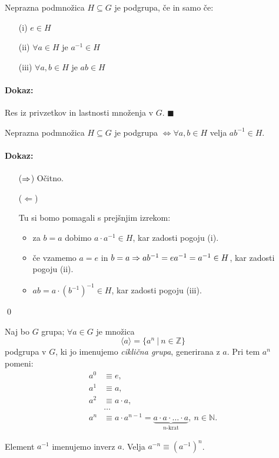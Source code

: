 \begin{trditev}
	Neprazna podmno\v zica $H \subseteq G$ je podgrupa, \v ce in samo \v ce:
	\begin{itemize}
		\item[(i)]{$e \in H$}
		\item[(ii)]{$\forall a \in H$ je $a^{-1} \in H$}
		\item[(iii)]{$\forall a,b \in H$ je $ab \in H$}
	\end{itemize}
\end{trditev}

\paragraph{Dokaz:} Res iz privzetkov in lastnosti mno\v zenja v $G$. $\blacksquare$

\begin{trditev}
	Neprazna podmno\v zica $H \subseteq G$ je podgrupa $\iff \forall a,b \in H$ velja $ab^{-1} \in H$.
\end{trditev}

\paragraph{Dokaz:}
\begin{itemize}
	\item[($\Rightarrow$)]{ O\v citno.}
	\item[($\Leftarrow$)]{Tu si bomo pomagali s prej\v snjim izrekom:
		\begin{itemize}
			\item{za $b = a$ dobimo $a\cdot a^{-1} \in H$, kar zadosti pogoju (i).}
			\item{\v ce vzamemo $a = e$ in $b = a \Rightarrow ab^{-1} = ea^{-1} = a^{-1} \in H$, kar zadosti pogoju (ii).}
			\item{$ab = a \cdot (b^{-1})^{-1} \in H$, kar zadosti pogoju (iii).}
		\end{itemize}}
\end{itemize}
\qed

\begin{posledica} Naj bo $G$ grupa; $\forall a \in G$ je mno\v zica
\[
	\langle a \rangle = \{a^n\ |\ n\in\mathbb{Z}\}
\]
podgrupa v $G$, ki jo imenujemo \emph{cikli\v cna grupa}, generirana z $a$. Pri tem $a^n$ pomeni:
\begin{align*}
	a^0 &\equiv e, \\
	a^1 &\equiv a, \\
	a^2 &\equiv a\cdot a, \\
	&\ldots \\
	a^n &\equiv a\cdot a^{n-1} = \underbrace{a\cdot a\cdot \ldots \cdot a}_{n\text{-krat}},\ n\in \mathbb{N}.
\end{align*}

\ni Element $a^{-1}$ imenujemo inverz $a$. Velja $a^{-n} \equiv (a^{-1})^n$.
\end{posledica}


